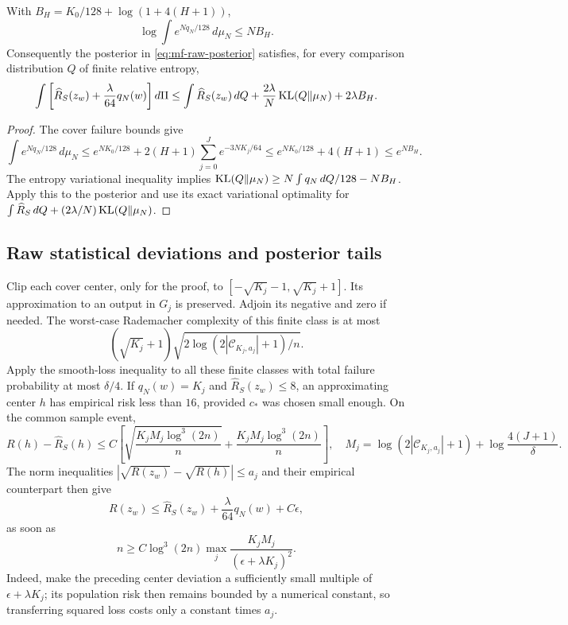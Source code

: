 \begin{lemma}
\label{lem:mf-multiscale-entropy}
With $B_H=K_0/128+\log(1+4(H+1))$,
\[
 \log\int e^{Nq_N/128}\,d\mu_N\le NB_H.
\]
Consequently the posterior in \eqref{eq:mf-raw-posterior} satisfies,
for every comparison distribution $Q$ of finite relative entropy,
\begin{equation}\label{eq:mf-complexity-comparison}
 \int\left[\widehat R_S(z_w)+\frac\lambda{64}q_N(w)\right]d\Pi
 \le\int\widehat R_S(z_w)\,dQ
       +\frac{2\lambda}{N}\operatorname{KL}(Q\Vert\mu_N)+2\lambda B_H.
\end{equation}
\end{lemma}
\begin{proof}
The cover failure bounds give
\[
 \int e^{Nq_N/128}\,d\mu_N
 \le e^{NK_0/128}+2(H+1)\sum_{j=0}^J e^{-3NK_j/64}
 \le e^{NK_0/128}+4(H+1)\le e^{NB_H}.
\]
The entropy variational inequality implies
$\operatorname{KL}(Q\Vert\mu_N)\ge N\int q_N\,dQ/128-NB_H$.
Apply this to the posterior and use its exact variational optimality
for $\int\widehat R_S\,dQ+(2\lambda/N)\operatorname{KL}(Q\Vert\mu_N)$.
\end{proof}

\subsection{Raw statistical deviations and posterior tails}

Clip each cover center, only for the proof, to
$[-\sqrt{K_j}-1,\sqrt{K_j}+1]$.  Its approximation to an output in
$G_j$ is preserved.  Adjoin its negative and zero if needed.  The
worst-case Rademacher complexity of this finite class is at most
\[
 (\sqrt{K_j}+1)
       \sqrt{2\log(2|\mathcal C_{K_j,a_j}|+1)/n}.
\]
Apply the smooth-loss inequality to all these finite classes with total
failure probability at most $\delta/4$.  If $q_N(w)=K_j$ and
$\widehat R_S(z_w)\le8$, an approximating center $h$ has empirical risk
less than $16$, provided $c_*$ was chosen small enough.  On the common
sample event,
\[
 R(h)-\widehat R_S(h)
 \le C\left[
 \sqrt{\frac{K_jM_j\log^3(2n)}n}
       +\frac{K_jM_j\log^3(2n)}n\right],
 \quad
 M_j=\log(2|\mathcal C_{K_j,a_j}|+1)
                 +\log\frac{4(J+1)}\delta.
\]
The norm inequalities
$|\sqrt{R(z_w)}-\sqrt{R(h)}|\le a_j$ and their empirical counterpart
then give
\begin{equation}\label{eq:mf-low-objective-deviation}
 R(z_w)\le\widehat R_S(z_w)+\frac\lambda{64}q_N(w)+C\epsilon,
\end{equation}
as soon as
\[
 n\ge C\log^3(2n)
          \max_j\frac{K_jM_j}{(\epsilon+\lambda K_j)^2}.
\]
Indeed, make the preceding center deviation a sufficiently small
multiple of $\epsilon+\lambda K_j$; its population risk then remains
bounded by a numerical constant, so transferring squared loss costs
only a constant times $a_j$.

